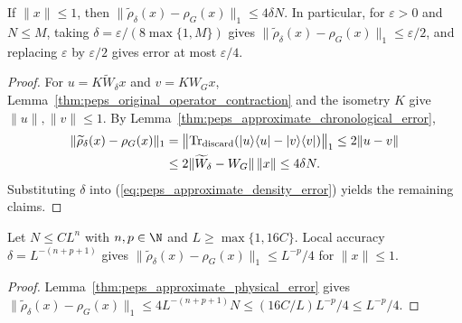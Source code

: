 \begin{lemma}
    \label{thm:peps_approximate_physical_error}
    \leanok
    If $\|x\|\le1$, then
    $\|\widetilde\rho_\delta(x)-\rho_G(x)\|_1\le4\delta N$.
    In particular, for $\varepsilon>0$ and $N\le M$, taking
    $\delta=\varepsilon/(8\max\{1,M\})$ gives
    $\|\widetilde\rho_\delta(x)-\rho_G(x)\|_1\le\varepsilon/2$, and replacing
    $\varepsilon$ by $\varepsilon/2$ gives error at most $\varepsilon/4$.
\end{lemma}
\begin{proof}
    \leanok
    For $u=K\widetilde W_\delta x$ and $v=KW_Gx$,
    Lemma~\ref{thm:peps_original_operator_contraction} and the isometry $K$
    give $\|u\|,\|v\|\le1$. By Lemma~\ref{thm:peps_approximate_chronological_error},
    \begin{align}
        \|\widetilde\rho_\delta(x)-\rho_G(x)\|_1
         & =\bigl\|\operatorname{Tr}_{\rm discard}
        (|u\rangle\langle u|-|v\rangle\langle v|)\bigr\|_1
        \le2\|u-v\|                                \notag \\
         & \le2\|\widetilde W_\delta-W_G\|\,\|x\|
        \le4\delta N.
        \label{eq:peps_approximate_density_error}
    \end{align}
    Substituting $\delta$ into (\ref{eq:peps_approximate_density_error}) yields
    the remaining claims.
\end{proof}

\begin{lemma}
    \label{thm:peps_approximate_natural_accuracy}
    \leanok
    Let $N\le CL^n$ with $n,p\in\N$ and $L\ge\max\{1,16C\}$. Local accuracy
    $\delta=L^{-(n+p+1)}$ gives
    $\|\widetilde\rho_\delta(x)-\rho_G(x)\|_1\le L^{-p}/4$
    for $\|x\|\le1$.
\end{lemma}
\begin{proof}
    \leanok
    Lemma~\ref{thm:peps_approximate_physical_error} gives
    $\|\widetilde\rho_\delta(x)-\rho_G(x)\|_1\le4L^{-(n+p+1)}N\le(16C/L)L^{-p}/4\le L^{-p}/4$.
\end{proof}

